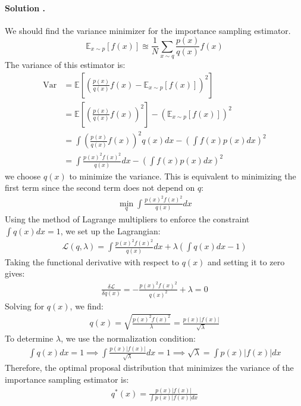 \documentclass{article}
\newcounter{solutionCount}
\newcommand{\solution}[1]{
    \stepcounter{solutionCount}
    \paragraph{Solution \thesolutionCount.}
    {
        #1
    }
}
\begin{document}
\solution{
    We should find the variance minimizer for the importance sampling estimator. 
    \[\mathbb{E}_{x\sim p}[f(x)]\approxeq \frac{1}{N} \sum_{x\sim q} \frac{p(x)}{q(x)}f(x)\]
    The variance of this estimator is:
    \begin{align*}
        \text{Var} &= \mathbb{E}\left[\left(\frac{p(x)}{q(x)}f(x) - \mathbb{E}_{x\sim p}[f(x)]\right)^2\right] \\
        &= \mathbb{E}\left[\left(\frac{p(x)}{q(x)}f(x)\right)^2\right] - \left(\mathbb{E}_{x\sim p}[f(x)]\right)^2 \\
        &= \int \left(\frac{p(x)}{q(x)}f(x)\right)^2 q(x) dx - \left(\int f(x)p(x) dx\right)^2 \\
        &= \int \frac{p(x)^2 f(x)^2}{q(x)} dx - \left(\int f(x)p(x) dx\right)^2
    \end{align*}
    we choose $q(x)$ to minimize the variance. This is equivalent to minimizing the first term since the second term does not depend on $q$:
    \begin{align*}
        \min_q \int \frac{p(x)^2 f(x)^2}{q(x)} dx
    \end{align*}
    Using the method of Lagrange multipliers to enforce the constraint $\int q(x) dx = 1$, we set up the Lagrangian:
    \begin{align*}
        \mathcal{L}(q, \lambda) = \int \frac{p(x)^2 f(x)^2}{q(x)} dx + \lambda \left( \int q(x) dx - 1 \right)
    \end{align*}
    Taking the functional derivative with respect to $q(x)$ and setting it to zero gives:
    \begin{align*}
        \frac{\delta \mathcal{L}}{\delta q(x)} = -\frac{p(x)^2 f(x)^2}{q(x)^2} + \lambda = 0
    \end{align*}
    Solving for $q(x)$, we find:
    \begin{align*} 
        q(x) = \sqrt{\frac{p(x)^2 f(x)^2}{\lambda}} = \frac{p(x)|f(x)|}{\sqrt{\lambda}}
    \end{align*}
    To determine $\lambda$, we use the normalization condition:
    \begin{align*}
        \int q(x) dx = 1 \implies \int \frac{p(x)|f(x)|}{\sqrt{\lambda}} dx = 1 \implies \sqrt{\lambda} = \int p(x)|f(x)| dx
    \end{align*}
    Therefore, the optimal proposal distribution that minimizes the variance of the importance sampling estimator is:
    \begin{align*}
        q^*(x) = \frac{p(x)|f(x)|}{\int p(x)|f(x)| dx}
    \end{align*}
}
\end{document}
